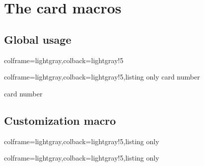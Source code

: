 \documentclass[11pt,a4paper]{ltxdoc}
\begin{document}
\section{The card macros}

\subsection{Global usage}

\begin{tcblisting}{colframe=lightgray,colback=lightgray!5}


\end{tcblisting}

\begin{tcblisting}{colframe=lightgray,colback=lightgray!5,listing only}
%
	{card number}
	
%
	{card number}
\end{tcblisting}

\subsection{Customization macro}


\begin{tcblisting}{colframe=lightgray,colback=lightgray!5,listing only}
\end{tcblisting}

\begin{tcblisting}{colframe=lightgray,colback=lightgray!5,listing only}
\def\intlogocardversotrivial{%
	\draw[white] (CARD-LOGO) node[rotate=90,text width=3.75cm,font=\Huge\sffamily,align=left] {{\TeX} \\\hfill{\itshape Pursuit}} ;
}
\end{tcblisting}
\end{document}
